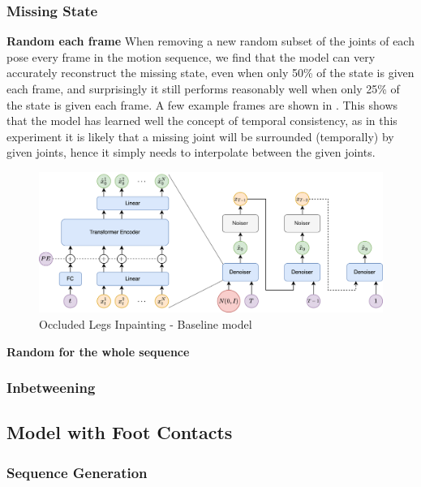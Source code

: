 \subsubsection{Missing State}
\textbf{Random each frame}
When removing a new random subset of the joints of each pose every frame in the motion sequence, we find that the model can very accurately reconstruct the missing state, even when only 50\% of the state is given each frame, and surprisingly it still performs reasonably well when only 25\% of the state is given each frame. A few example frames are shown in . This shows that the model has learned well the concept of temporal consistency, as in this experiment it is likely that a missing joint will be surrounded (temporally) by given joints, hence it simply needs to interpolate between the given joints.

\begin{figure}[!ht]
    \centering
    \includegraphics[width=1\textwidth]{Figures/diffusion/Network_diagram.png}
    \caption{Occluded Legs Inpainting - Baseline model}
    \label{fig:baseline_occluded_legs}
\end{figure}

\textbf{Random for the whole sequence}


\subsubsection{Inbetweening}


\subsection{Model with Foot Contacts}

\subsubsection{Sequence Generation}
